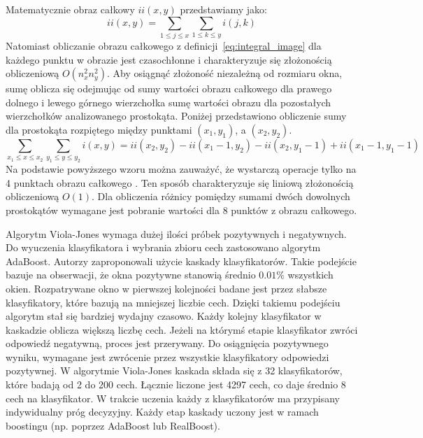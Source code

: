 \FloatBarrier
Matematycznie obraz całkowy $ii(x,y)$ przedstawiamy jako:
\begin{equation}
    \label{eq:integral_image}
    ii(x,y) = \sum_{1\leq j \leq x} \sum_{1\leq k \leq y} i(j,k)
\end{equation}
Natomiast obliczanie obrazu całkowego z definicji~\eqref{eq:integral_image} dla każdego punktu w obrazie jest czasochłonne i charakteryzuje się złożonością obliczeniową $O(n_x^2 n_y^2)$.
Aby osiągnąć złożoność niezależną od rozmiaru okna, sumę oblicza się odejmując od sumy wartości obrazu całkowego dla prawego dolnego i lewego górnego wierzchołka sumę wartości obrazu dla pozostałych wierzchołków analizowanego prostokąta.
Poniżej przedstawiono obliczenie sumy dla prostokąta rozpiętego między punktami $(x_1, y_1)$, a $(x_2, y_2)$.
\begin{equation}
    \label{eq:integral_image_x_y}
    \sum_{x_1\leq x \leq x_2} \sum_{y_1\leq y \leq y_2} i(x,y) = ii(x_2, y_2) - ii(x_1 - 1, y_2) - ii(x_2, y_1 - 1) + ii(x_1 - 1, y_1 - 1)
\end{equation}
Na podstawie powyższego wzoru można zauważyć, że wystarczą operacje tylko na 4 punktach obrazu całkowego \cite{szybka_detekcja_klesk}.
Ten sposób charakteryzuje się liniową złożonością obliczeniową $O(1)$.
Dla obliczenia różnicy pomiędzy sumami dwóch dowolnych prostokątów wymagane jest pobranie wartości dla 8 punktów z obrazu całkowego.

Algorytm Viola-Jones wymaga dużej ilości próbek pozytywnych i negatywnych.
Do wyuczenia klasyfikatora i wybrania zbioru cech zastosowano algorytm AdaBoost.
Autorzy zaproponowali użycie kaskady klasyfikatorów.
Takie podejście bazuje na obserwacji, że okna pozytywne stanowią średnio $0.01\%$ wszystkich okien.
Rozpatrywane okno w pierwszej kolejności badane jest przez słabsze klasyfikatory, które bazują na mniejszej liczbie cech.
Dzięki takiemu podejściu algorytm stał się bardziej wydajny czasowo.
Każdy kolejny klasyfikator w kaskadzie oblicza większą liczbę cech.
Jeżeli na którymś etapie klasyfikator zwróci odpowiedź negatywną, proces jest przerywany.
Do osiągnięcia pozytywnego wyniku, wymagane jest zwrócenie przez wszystkie klasyfikatory odpowiedzi pozytywnej.
W algorytmie Viola-Jones kaskada składa się z 32 klasyfikatorów, które badają od 2 do 200 cech.
Łącznie liczone jest 4297 cech, co daje średnio 8 cech na klasyfikator.
W trakcie uczenia każdy z klasyfikatorów ma przypisany indywidualny próg decyzyjny.
Każdy etap kaskady uczony jest w ramach boostingu (np. poprzez AdaBoost lub
RealBoost).

